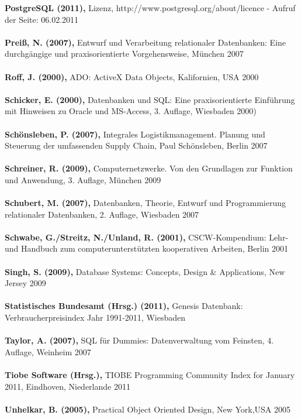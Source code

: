 \textbf{PostgreSQL (2011),} Lizenz, http://www.postgresql.org/about/licence - Aufruf der Seite: 06.02.2011\\\\
\textbf{Preiß, N. (2007),} Entwurf und Verarbeitung relationaler Datenbanken: Eine durchgängige und praxisorientierte Vorgehensweise, München 2007\\\\
\textbf{Roff, J. (2000),} ADO: ActiveX Data Objects, Kalifornien, USA 2000\\\\
\textbf{Schicker, E. (2000),} Datenbanken und SQL: Eine praxisorientierte Einführung mit Hinweisen zu Oracle und MS-Access, 3. Auflage, Wiesbaden 2000)\\\\
\textbf{Schönsleben, P. (2007),} Integrales Logistikmanagement. Planung und Steuerung der umfassenden Supply Chain, Paul Schönsleben, Berlin 2007\\\\
\textbf{Schreiner, R. (2009),} Computernetzwerke. Von den Grundlagen zur Funktion und Anwendung, 3. Auflage, München 2009\\\\
\textbf{Schubert, M. (2007),} Datenbanken, Theorie, Entwurf und Programmierung relationaler Datenbanken, 2. Auflage, Wiesbaden 2007\\\\
\textbf{Schwabe, G./Streitz, N./Unland, R. (2001),} CSCW-Kompendium: Lehr- und Handbuch zum computerunterstützten kooperativen Arbeiten, Berlin 2001\\\\
\textbf{Singh, S. (2009),} Database Systems: Concepts, Design \& Applications, New Jersey 2009\\\\
\textbf{Statistisches Bundesamt (Hrsg.) (2011),} Genesis Datenbank: Verbraucherpreisindex Jahr 1991-2011, Wiesbaden\\\\
\textbf{Taylor, A. (2007),} SQL für Dummies: Datenverwaltung vom Feinsten, 4. Auflage, Weinheim 2007\\\\
\textbf{Tiobe Software (Hrsg.),} TIOBE Programming Community Index for January 2011, Eindhoven, Niederlande 2011\\\\
\textbf{Unhelkar, B. (2005),} Practical Object Oriented Design, New York,USA 2005\\\\
